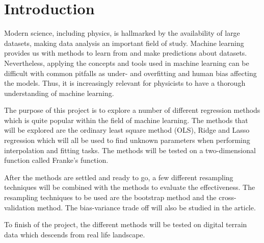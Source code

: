 \documentclass[../main.tex]{subfiles}
\begin{document}
\section{Introduction}\label{sec:introduction}
Modern science, including physics, is hallmarked by the availability of large datasets, making data analysis an important field of study. Machine learning provides us with methods to learn from and make predictions about datasets. 
Nevertheless, applying the concepts and tools used in machine learning can be difficult with common pitfalls as under- and overfitting and human bias affecting the models. Thus, it is increasingly relevant for physicists to have a thorough understanding of machine learning.  

The purpose of this project is to explore a number of different regression methods which is quite popular within the field of machine learning. The methods that will be explored are the ordinary least square method (OLS), Ridge and Lasso regression which will all be used to find unknown parameters when performing interpolation and fitting tasks. The methods will be tested on a two-dimensional function called Franke’s function.

After the methods are settled and ready to go, a few different resampling techniques will be combined with the methods to evaluate the effectiveness. The resampling techniques to be used are the bootstrap method and the cross-validation method. The bias-variance trade off will also be studied in the article.

To finish of the project, the different methods will be tested on digital terrain data which descends from real life landscape.
\end{document}
